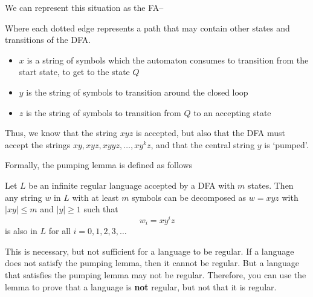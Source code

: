 We can represent this situation as the FA--
\begin{center}
\end{center}
Where each dotted edge represents a path that may contain other states and transitions of the DFA.
\begin{itemize}
  \item $x$ is a string of symbols which the automaton consumes to transition from the start state, to get to the state
   $Q$
  \item $y$ is the string of symbols to transition around the closed loop
  \item $z$ is the string of symbols to transition from $Q$ to an accepting state
\end{itemize}

Thus, we know that the string $xyz$ is accepted, but also that the DFA must accept the strings
 $xy, xyz, xyyz, \ldots, x{y^k}z$, and that the central string $y$ is `pumped'.

Formally, the pumping lemma is defined as follows
\begin{definition*}{}{}
  Let $L$ be an infinite regular language accepted by a DFA with $m$ states. Then any string $w$ in $L$ with at least $m$
   symbols can be decomposed as $w = xyz$ with $|xy| \leq m$ and $|y| \geq 1$ such that
  \begin{equation*}
    w_i = x{y^i}z
  \end{equation*}
  is also in $L$ for all $i = 0, 1, 2, 3, \ldots$
\end{definition*}

This is necessary, but not sufficient for a language to be regular. If a language does not satisfy the pumping lemma,
 then it cannot be regular. But a language that satisfies the pumping lemma may not be regular. Therefore, you can use
 the lemma to prove that a language is \textbf{not} regular, but not that it is regular.
